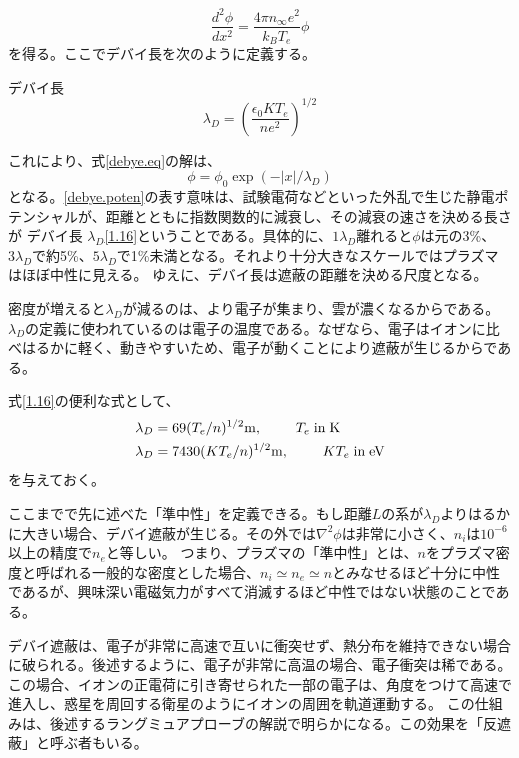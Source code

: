 \documentclass{ltjsarticle}
\numberwithin{equation}{section} %
\begin{document}
\begin{equation}
  \frac{d^2 \phi}{dx^2} = \frac{4\pi n_\infty e^2}{k_B T_e}\phi \label{debye.eq}
\end{equation}
を得る。ここでデバイ長を次のように定義する。

\begin{eqbox}{デバイ長}
\begin{equation}
 \lambda_D = \left(\dfrac{\epsilon_0 KT_e}{ne^2}\right)^{1/2} \label{1.16}
\end{equation}
\end{eqbox}
これにより、式\eqref{debye.eq}の解は、
\begin{equation}
  \phi = \phi_0 \exp(-|x|/\lambda_D) \label{debye.poten}
\end{equation}
となる。\eqref{debye.poten}の表す意味は、試験電荷などといった外乱で生じた静電ポテンシャルが、距離とともに指数関数的に減衰し、その減衰の速さを決める長さが デバイ長 
$\lambda_D$\eqref{1.16}ということである。具体的に、$1\lambda_D$離れると$\phi$は元の3\%、$3\lambda_D$で約5\%、$5\lambda_D$で1\%未満となる。それより十分大きなスケールではプラズマはほぼ中性に見える。
ゆえに、デバイ長は遮蔽の距離を決める尺度となる。

密度が増えると$\lambda_D$が減るのは、より電子が集まり、雲が濃くなるからである。$\lambda_D$の定義に使われているのは電子の温度である。なぜなら、電子はイオンに比べはるかに軽く、動きやすいため、電子が動くことにより遮蔽が生じるからである。

式\eqref{1.16}の便利な式として、
\begin{align}
  \begin{split}
    \lambda_D &= 69(T_e/n)^{1/2}\si{\metre}, \hspace{2pc}  T_e \; \text{in} \; \si{\kelvin}\\
    \lambda_D &= 7430(KT_e/n)^{1/2}\si{\metre}, \hspace{2pc} KT_e \; \text{in} \; \si{\electronvolt}
  \end{split}
\end{align}
を与えておく。

ここまでで先に述べた「準中性」を定義できる。もし距離$L$の系が$\lambda_D$よりはるかに大きい場合、デバイ遮蔽が生じる。その外では$\nabla^2 \phi$は非常に小さく、$n_i$は$10^{-6}$以上の精度で$n_e$と等しい。
つまり、プラズマの「準中性」とは、$n$をプラズマ密度と呼ばれる一般的な密度とした場合、$n_i \simeq n_e \simeq n$とみなせるほど十分に中性であるが、興味深い電磁気力がすべて消滅するほど中性ではない状態のことである。 

デバイ遮蔽は、電子が非常に高速で互いに衝突せず、熱分布を維持できない場合に破られる。後述するように、電子が非常に高温の場合、電子衝突は稀である。この場合、イオンの正電荷に引き寄せられた一部の電子は、角度をつけて高速で進入し、惑星を周回する衛星のようにイオンの周囲を軌道運動する。
この仕組みは、後述するラングミュアプローブの解説で明らかになる。この効果を「反遮蔽」と呼ぶ者もいる。
\end{document}
